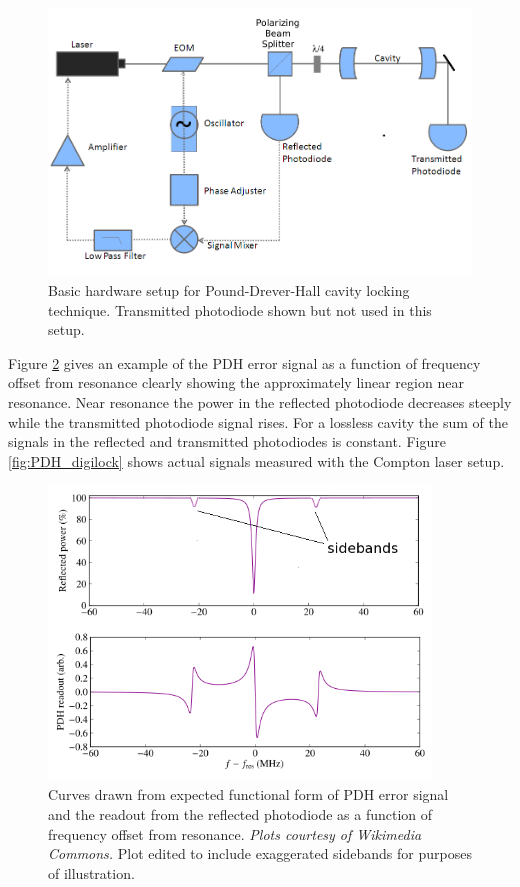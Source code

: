 \begin{figure}
\begin{center}
\includegraphics[width=5in]{./Pictures/PDH_setup.PNG}
\caption{Basic hardware setup for Pound-Drever-Hall cavity locking technique. Transmitted photodiode shown but not used in this setup.}
\label{fig:PDH_setup}
\end{center}
\end{figure}

Figure \ref{fig:PDH_signals} gives an example of the PDH error signal as a function of frequency offset from resonance clearly showing the approximately linear region near resonance. Near resonance the power in the reflected photodiode decreases steeply while the transmitted photodiode signal rises. For a lossless cavity the sum of the signals in the reflected and transmitted photodiodes is constant. Figure \ref{fig:PDH_digilock} shows actual signals measured with the Compton laser setup.

\begin{figure}
\begin{center}
\includegraphics[width=4in]{./Pictures/PDH_signals_sidebands}
\caption{Curves drawn from expected functional form of PDH error signal and the readout from the reflected photodiode as a function of frequency offset from resonance. {\it Plots courtesy of Wikimedia Commons.} Plot edited to include exaggerated sidebands for purposes of illustration.}
\label{fig:PDH_signals}
\end{center}
\end{figure}

